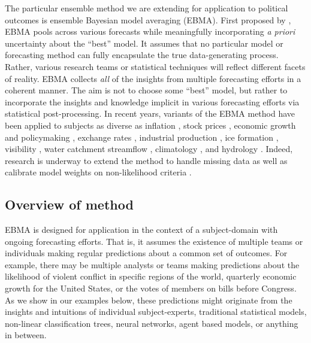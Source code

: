 The particular ensemble method we are extending for application to
political outcomes is ensemble Bayesian model averaging (EBMA). First
proposed by \citet{Raftery:2005}, EBMA pools across various forecasts
while meaningfully incorporating \textit{a priori} uncertainty about
the ``best'' model.  It assumes that no particular model or
forecasting method can fully encapsulate the true data-generating
process.  Rather, various research teams or statistical techniques
will reflect different facets of reality. EBMA collects \textit{all}
of the insights from multiple forecasting efforts in a coherent
manner.  The aim is not to choose some ``best'' model, but rather to
incorporate the insights and knowledge implicit in various forecasting
efforts via statistical post-processing.  In recent years, variants of
the EBMA method have been applied to subjects as diverse as inflation
\citep{Wright:2009, Koop:2010, Gneiting:2010}, stock prices
\citep{Billio:2011}, economic growth and policymaking
\citep{Brock:2007, Billio:2010}, exchange rates \citep{Wright:2008},
industrial production \citep{Feldkircher:2010}, ice formation
\citep{Berrocal:2010}, visibility \citep{Chmielecki:2010}, water
catchment streamflow \citep{Viney:2009}, climatology \citep{Min:2006,
  Min:2007, Smith:2009}, and hydrology \citep{Zhang:2009}.  Indeed,
research is underway to extend the method to handle missing data
\citep{Fraley:2010, Mccandless:2011} as well as calibrate model
weights on non-likelihood criteria \citep[e.g.,][]{Vrugt:2006}.



\subsection{Overview of method}

EBMA is designed for application in the context of a subject-domain
with ongoing forecasting efforts.  That is, it assumes the existence
of multiple teams or individuals making regular predictions about a
common set of outcomes.  For example, there may be multiple analysts
or teams making predictions about the likelihood of violent conflict
in specific regions of the world, quarterly economic growth for the
United States, or the votes of members on bills before Congress.  As
we show in our examples below, these predictions might originate from
the insights and intuitions of individual subject-experts, traditional
statistical models, non-linear classification trees, neural networks,
agent based models, or anything in between.

